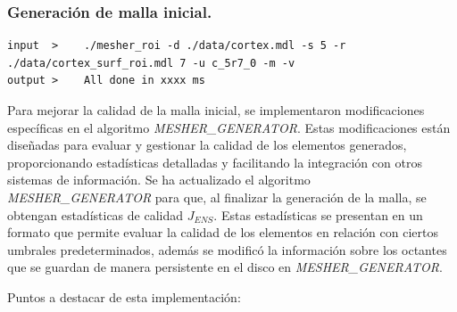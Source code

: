 \subsubsection{Generación de malla inicial.}


\begin{lstlisting}[style=Console,caption={Generador de malla, crea una malla refinada a nivel 5 y especificamente refina la superficie entregada a nivel 7, se exportará la malla con el nombre \textit{c\_5r7\_0}, en formato vtk y m3d.\\ Fuente: Elaboración propia.}]
input  >    ./mesher_roi -d ./data/cortex.mdl -s 5 -r ./data/cortex_surf_roi.mdl 7 -u c_5r7_0 -m -v
output >    All done in xxxx ms
\end{lstlisting}



Para mejorar la calidad de la malla inicial, se implementaron modificaciones específicas en el algoritmo \textit{ MESHER\_GENERATOR}. Estas modificaciones están diseñadas para evaluar y gestionar la calidad de los elementos generados, proporcionando estadísticas detalladas y facilitando la integración con otros sistemas de información.
Se ha actualizado el algoritmo \textit{MESHER\_GENERATOR} para que, al finalizar la generación de la malla, se obtengan estadísticas de calidad $J_{ENS}$. Estas estadísticas se presentan en un formato que permite evaluar la calidad de los elementos en relación con ciertos umbrales predeterminados, además se modificó la información sobre los octantes que se guardan de manera persistente en el disco en \textit{MESHER\_GENERATOR}.

Puntos a destacar de esta implementación:
    
